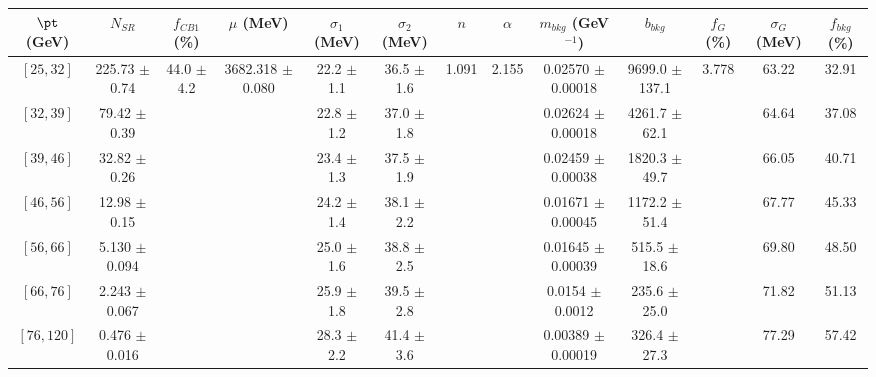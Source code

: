 \begin{tabular}{c||c|c|c|c|c|c|c|c|c|c|c||c}
$\pt$ (GeV) & $N_{SR}$ & $f_{CB1}$ (\%) & $\mu$ (MeV) & $\sigma_1$ (MeV) & $\sigma_2$ (MeV) & $n$ & $\alpha$ & $m_{bkg}$ (GeV$^{-1}$) & $b_{bkg}$ & $f_G$ (\%) & $\sigma_G$ (MeV) & $f_{bkg}$ (\%) \\
\hline
$[25, 32]$ & 225.73 $\pm$ 0.74 & \multirow{7}{*}{44.0 $\pm$ 4.2} & \multirow{7}{*}{3682.318 $\pm$ 0.080} & 22.2 $\pm$ 1.1 & 36.5 $\pm$ 1.6 & \multirow{7}{*}{1.091} & \multirow{7}{*}{2.155} & 0.02570 $\pm$ 0.00018 & 9699.0 $\pm$ 137.1 & \multirow{7}{*}{3.778} & 63.22 & 32.91\\
$[32, 39]$ & 79.42 $\pm$ 0.39 &  &  & 22.8 $\pm$ 1.2 & 37.0 $\pm$ 1.8 &  &  & 0.02624 $\pm$ 0.00018 & 4261.7 $\pm$ 62.1 &  & 64.64 & 37.08\\
$[39, 46]$ & 32.82 $\pm$ 0.26 &  &  & 23.4 $\pm$ 1.3 & 37.5 $\pm$ 1.9 &  &  & 0.02459 $\pm$ 0.00038 & 1820.3 $\pm$ 49.7 &  & 66.05 & 40.71\\
$[46, 56]$ & 12.98 $\pm$ 0.15 &  &  & 24.2 $\pm$ 1.4 & 38.1 $\pm$ 2.2 &  &  & 0.01671 $\pm$ 0.00045 & 1172.2 $\pm$ 51.4 &  & 67.77 & 45.33\\
$[56, 66]$ & 5.130 $\pm$ 0.094 &  &  & 25.0 $\pm$ 1.6 & 38.8 $\pm$ 2.5 &  &  & 0.01645 $\pm$ 0.00039 & 515.5 $\pm$ 18.6 &  & 69.80 & 48.50\\
$[66, 76]$ & 2.243 $\pm$ 0.067 &  &  & 25.9 $\pm$ 1.8 & 39.5 $\pm$ 2.8 &  &  & 0.0154 $\pm$ 0.0012 & 235.6 $\pm$ 25.0 &  & 71.82 & 51.13\\
$[76, 120]$ & 0.476 $\pm$ 0.016 &  &  & 28.3 $\pm$ 2.2 & 41.4 $\pm$ 3.6 &  &  & 0.00389 $\pm$ 0.00019 & 326.4 $\pm$ 27.3 &  & 77.29 & 57.42\\
\end{tabular}
